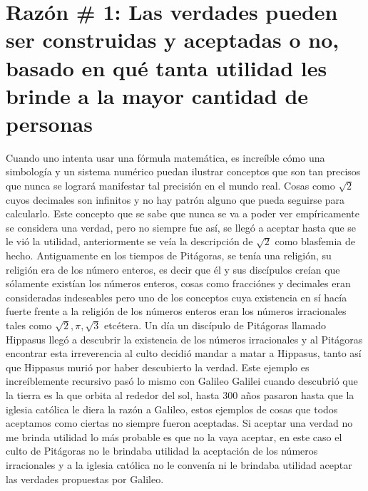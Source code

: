 \documentclass{article}
\begin{document}
\section{Razón \# 1: Las verdades pueden ser construidas y aceptadas o no, basado en qué tanta utilidad les brinde a la mayor cantidad de personas}
Cuando uno intenta usar una fórmula matemática, es increíble cómo una simbología y un sistema numérico puedan ilustrar conceptos que son tan precisos que nunca se logrará manifestar tal precisión en el mundo real. 
Cosas como $\sqrt{2}$ cuyos decimales son infinitos y no hay patrón alguno que pueda seguirse para calcularlo. Este concepto que se sabe que nunca se va a poder ver empíricamente se considera una verdad, pero no siempre fue así, se llegó a aceptar hasta que se le vió la utilidad, anteriormente se veía la descripción de $\sqrt{2}$ como blasfemia de hecho. 
Antiguamente en los tiempos de Pitágoras, se tenía una religión, su religión era de los número enteros, es decir que él y sus discípulos creían que sólamente existían los números enteros, cosas como fracciónes y decimales eran consideradas indeseables pero uno de los conceptos cuya existencia en sí hacía fuerte frente a la religión de los números enteros eran los números irracionales tales como $\sqrt{2}, \pi, \sqrt{3}$ etcétera. 
Un día un discípulo de Pitágoras llamado Hippasus llegó a descubrir la existencia de los números irracionales y al Pitágoras encontrar esta irreverencia al culto decidió mandar a matar a Hippasus, tanto así que Hippasus murió por haber descubierto la verdad. 
Este ejemplo es increíblemente recursivo pasó lo mismo con Galileo Galilei cuando descubrió que la tierra es la que orbita al rededor del sol, hasta 300 años pasaron hasta que la iglesia católica le diera la razón a Galileo, estos ejemplos de cosas que todos aceptamos como ciertas no siempre fueron aceptadas.
Si aceptar una verdad no me brinda utilidad lo más probable es que no la vaya aceptar, en este caso el culto de Pitágoras no le brindaba utilidad la aceptación de los números irracionales y a la iglesia católica no le convenía ni le brindaba utilidad aceptar las verdades propuestas por Galileo.

\end{document}
